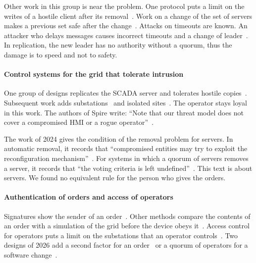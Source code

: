 Other work in this group is near the problem. One protocol puts a limit on the writes of a
hostile client after its removal~\cite{liskov2006byzclients}. Work on a change of the set of
servers makes a previous set safe after the change~\cite{kuznetsov2022reconfig}. Attacks on
timeouts are known. An attacker who delays messages causes incorrect timeouts and a change
of leader~\cite{tennage2023quepaxa,giuliari2024dos}. In replication, the new leader has no
authority without a quorum, thus the damage is to speed and not to safety.

\paragraph{Control systems for the grid that tolerate intrusion}
One group of designs replicates the SCADA server and tolerates hostile
copies~\cite{kirsch2014survivable,babay2018spire,babay2019deploying}. Subsequent work adds
substations~\cite{bommareddy2022realtime} and isolated sites~\cite{bommareddy2024compound}.
The operator stays loyal in this work. The authors of Spire write: ``Note that our threat
model does not cover a compromised HMI or a rogue operator''~\cite{babay2018spire}.

The work of 2024 gives the condition of the removal problem for servers. In automatic
removal, it records that ``compromised entities may try to exploit the reconfiguration
mechanism''~\cite{bommareddy2024compound}. For systems in which a quorum of servers removes
a server, it records that ``the voting criteria is left
undefined''~\cite{bommareddy2024compound}. This text is about servers. We found no
equivalent rule for the person who gives the orders.

\paragraph{Authentication of orders and access of operators}
Signatures show the sender of an
order~\cite{saxena2018signature,amoah2015dnp3,esiner2023provenance}. Other methods compare
the contents of an order with a simulation of the grid before the device obeys
it~\cite{meliopoulos2016command,mashima2018onthefly,mashima2019delaying,hong2019resilient}.
Access control for operators puts a limit on the substations that an operator
controls~\cite{nasr2018operator,nasr2024authorization}. Two designs of 2026 add a second
factor for an order~\cite{ahmad2026gridlogic} or a quorum of operators for a software
change~\cite{pawar2026certiflash}.

